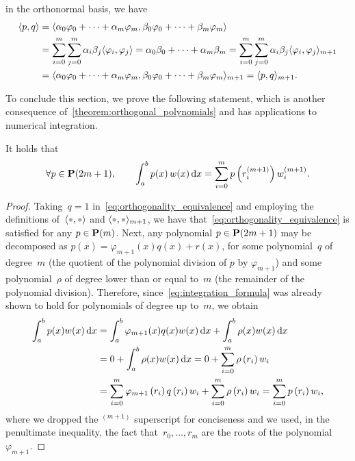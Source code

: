 in the orthonormal basis,
we have
\begin{align*}
    \langle p, q\rangle
    &= \langle\alpha_0 \varphi_0 + \dotsb + \alpha_m \varphi_m,\beta_0 \varphi_0 + \dotsb + \beta_m \varphi_m\rangle \\
    &= \sum_{i=0}^{m} \sum_{j=0}^{m} \alpha_i \beta_j \langle\varphi_i, \varphi_j\rangle
    = \alpha_0 \beta_0 + \dotsb + \alpha_m \beta_m
    = \sum_{i=0}^{m} \sum_{j=0}^{m} \alpha_i \beta_j \langle\varphi_i, \varphi_j\rangle_{m+1} \\
    & = \langle\alpha_0 \varphi_0 + \dotsb + \alpha_m \varphi_m,\beta_0 \varphi_0 + \dotsb + \beta_m \varphi_m\rangle_{m+1} = \langle p,q\rangle_{m+1}.
\end{align*}

To conclude this section,
we prove the following statement,
which is another consequence of~\cref{theorem:orthogonal_polynomials} and has applications to numerical integration.
\begin{theorem}
It holds that
\begin{equation}
    \label{eq:integration_formula}
    \forall p \in \mathbf P(2m+1),
    \qquad \int_{a}^{b} p(x) \, w(x) \, \mathrm d x
    = \sum_{i=0}^{m} p\left(r_i^{(m+1)}\right) w^{(m+1)}_i.
\end{equation}
\end{theorem}
\begin{proof}
    Taking~$q = 1$ in~\eqref{eq:orthogonality_equivalence} and employing the definitions of~$\ip{\placeholder, \placeholder}$ and $\ip{\placeholder, \placeholder}_{m+1}$,
    we have that~\eqref{eq:orthogonality_equivalence} is satisfied for any $p \in \mathbf P(m)$.
    Next, any polynomial $p \in \mathbf P(2m+1)$ may be decomposed as $p(x) = \varphi_{m+1}(x) q(x) + r(x)$,
    for some polynomial~$q$ of degree~$m$ (the quotient of the polynomial division of $p$ by $\varphi_{m+1}$) and some polynomial~$\rho$ of degree lower than or equal to~$m$ (the remainder of the polynomial division).
    Therefore, since~\eqref{eq:integration_formula} was already shown to hold for polynomials of degree up to~$m$,
    we obtain
    \begin{align*}
        \int_{a}^{b} p(x) w(x) \, \mathrm d x
        &= \int_{a}^{b} \varphi_{m+1}(x) q(x) w(x) \, \mathrm d x + \int_{a}^{b} \rho(x) w(x) \, \mathrm d x \\
        &= 0 + \int_{a}^{b} \rho(x) w(x) \, \mathrm d x
        = 0 + \sum_{i=0}^{m} \rho\left(r_i\right) w_i \\
        &= \sum_{i=0}^{m} \varphi_{m+1}\left(r_i\right) q\left(r_i\right)  w_i + \sum_{i=0}^{m} \rho\left(r_i\right) w_i = \sum_{i=0}^{m} p\left(r_i\right) w_i,
    \end{align*}
    where we dropped the $^{(m+1)}$ superscript for conciseness and
    we used, in the penultimate inequality,
    the fact that~$r_0, \dotsc, r_m$ are the roots of the polynomial~$\varphi_{m+1}$.
\end{proof}
